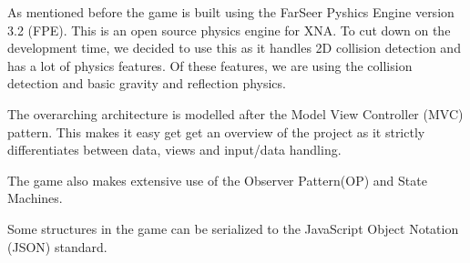 As mentioned before the game is built using the FarSeer Pyshics Engine version 3.2 (FPE). This is an open source physics engine for XNA. To cut down on the development time, we decided to use this as it handles 2D collision detection and has a lot of physics features. Of these features, we are using the collision detection and basic gravity and reflection physics.

The overarching architecture is modelled after the Model View Controller (MVC) pattern. This makes it easy get get an overview of the project as it strictly differentiates between data, views and input/data handling. 

The game also makes extensive use of the Observer Pattern(OP) and State Machines. 

Some structures in the game can be serialized to the JavaScript Object Notation (JSON) standard. 

